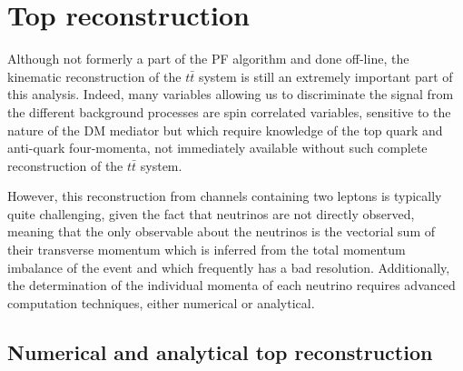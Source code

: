 \documentclass[a4paper, 10pt, openright]{report}
\begin{document}
\section{Top reconstruction} \label{section:RecoTop}

Although not formerly a part of the \ac{PF} algorithm and done off-line, the kinematic reconstruction of the $t \bar t$ system is still an extremely important part of this analysis. Indeed, many variables allowing us to discriminate the signal from the different background processes are spin correlated variables, sensitive to the nature of the \ac{DM} mediator but which require knowledge of the top quark and anti-quark four-momenta, not immediately available without such complete reconstruction of the $t \bar t$ system. 

However, this reconstruction from channels containing two leptons is typically quite challenging, given the fact that neutrinos are not directly observed, meaning that the only observable about the neutrinos is the vectorial sum of their transverse momentum which is inferred from the total momentum imbalance of the event and which frequently has a bad resolution. Additionally, the determination of the individual momenta of each neutrino requires advanced computation techniques, either numerical or analytical.

\subsection{Numerical and analytical top reconstruction}
\end{document}
